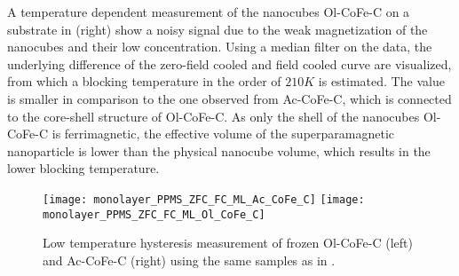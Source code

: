 \documentclass[\main/dresen_thesis.tex]{subfiles}
\begin{document}
  A temperature dependent measurement of the nanocubes Ol-CoFe-C on a substrate in  (right) show a noisy signal due to the weak magnetization of the nanocubes and their low concentration.
  Using a median filter on the data, the underlying difference of the zero-field cooled and field cooled curve are visualized, from which a blocking temperature in the order of $210 \unit{K}$ is estimated.
  The value is smaller in comparison to the one observed from Ac-CoFe-C, which is connected to the core-shell structure of Ol-CoFe-C.
  As only the shell of the nanocubes Ol-CoFe-C is ferrimagnetic, the effective volume of the superparamagnetic nanoparticle is lower than the physical nanocube volume, which results in the lower blocking temperature.

  \begin{figure}[tb]
    \centering
    \texttt{[image: monolayer\_PPMS\_ZFC\_FC\_ML\_Ac\_CoFe\_C]}
    \texttt{[image: monolayer\_PPMS\_ZFC\_FC\_ML\_Ol\_CoFe\_C]}
    \caption{\label{fig:monolayers:nanoparticle:vsm10K}Low temperature hysteresis measurement of frozen Ol-CoFe-C (left) and Ac-CoFe-C (right) using the same samples as in .}
  \end{figure}
\end{document}

